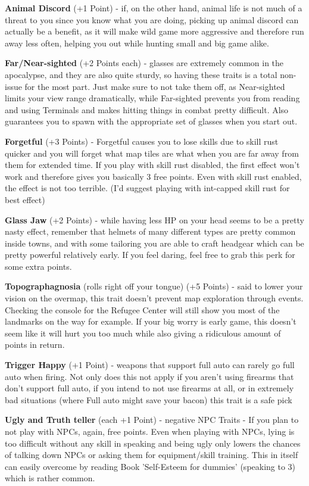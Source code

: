 \documentclass[11pt]{report}
\begin{document}
\textbf{Animal Discord} (+1 Point) - if, on the other hand, animal life is not much of a threat to you since you know what you are doing, picking up animal discord can actually be a benefit, as it will make wild game more aggressive and therefore run away less often, helping you out while hunting small and big game alike.

\textbf{Far/Near-sighted} (+2 Points each) - glasses are extremely common in the apocalypse, and they are also quite sturdy, so having these traits is a total non-issue for the most part. Just make sure to not take them off, as Near-sighted limits your view range dramatically, while Far-sighted prevents you from reading and using Terminals and makes hitting things in combat pretty difficult. Also guarantees you to spawn with the appropriate set of glasses when you start out.

\textbf{Forgetful} (+3 Points) - Forgetful causes you to lose skills due to skill rust quicker and you will forget what map tiles are what when you are far away from them for extended time. If you play with skill rust disabled, the first effect won't work and therefore gives you basically 3 free points. Even with skill rust enabled, the effect is not too terrible. (I'd suggest playing with int-capped skill rust for best effect)

\textbf{Glass Jaw} (+2 Points) - while having less HP on your head seems to be a pretty nasty effect, remember that helmets of many different types are pretty common inside towns, and with some tailoring you are able to craft headgear which can be pretty powerful relatively early. If you feel daring, feel free to grab this perk for some extra points.

\textbf{Topographagnosia} (rolls right off your tongue) (+5 Points) - said to lower your vision on the overmap, this trait doesn't prevent map exploration through events. Checking the console for the Refugee Center will still show you most of the landmarks on the way for example. If your big worry is early game, this doesn't seem like it will hurt you too much while also giving a ridiculous amount of points in return.

\textbf{Trigger Happy} (+1 Point) - weapons that support full auto can rarely go full auto when firing. Not only does this not apply if you aren't using firearms that don't support full auto, if you intend to not use firearms at all, or in extremely bad situations (where Full auto might save your bacon) this trait is a safe pick

\textbf{Ugly and Truth teller} (each +1 Point) - negative NPC Traits - If you plan to not play with NPCs, again, free points. Even when playing with NPCs, lying is too difficult without any skill in speaking and being ugly only lowers the chances of talking down NPCs or asking them for equipment/skill training. This in itself can easily overcome by reading Book 'Self-Esteem for dummies' (speaking to 3) which is rather common.
\end{document}
